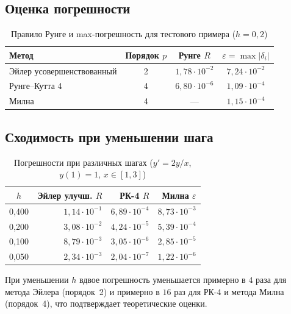 \documentclass[a4paper,12pt]{article}
\begin{document}
\subsection{Оценка погрешности}

\begin{table}[H]
\centering
\caption{Правило Рунге и max-погрешность для тестового примера ($h=0{,}2$)}
\begin{tabular}{lccc}
\toprule
Метод & Порядок $p$ & Рунге $R$ & $\varepsilon = \max|\delta_i|$ \\
\midrule
Эйлер усовершенствованный & 2 & $1{,}78 \cdot 10^{-2}$ & $7{,}24 \cdot 10^{-2}$ \\
Рунге--Кутта 4              & 4 & $6{,}80 \cdot 10^{-6}$ & $1{,}09 \cdot 10^{-4}$ \\
Милна                         & 4 & ---                    & $1{,}15 \cdot 10^{-4}$ \\
\bottomrule
\end{tabular}
\end{table}

\subsection{Сходимость при уменьшении шага}

\begin{table}[H]
\centering
\caption{Погрешности при различных шагах ($y' = 2y/x$, $y(1)=1$, $x \in [1,3]$)}
\begin{tabular}{crrr}
\toprule
$h$ & Эйлер улучш. $R$ & РК-4 $R$ & Милна $\varepsilon$ \\
\midrule
0,400 & $1,14 \cdot 10^{-1}$ & $6,89 \cdot 10^{-4}$ & $8,73 \cdot 10^{-3}$ \\
0,200 & $3,08 \cdot 10^{-2}$ & $4,24 \cdot 10^{-5}$ & $5,39 \cdot 10^{-4}$ \\
0,100 & $8,79 \cdot 10^{-3}$ & $3,05 \cdot 10^{-6}$ & $2,85 \cdot 10^{-5}$ \\
0,050 & $2,34 \cdot 10^{-3}$ & $2,04 \cdot 10^{-7}$ & $1,22 \cdot 10^{-6}$ \\
\bottomrule
\end{tabular}
\end{table}

При уменьшении $h$ вдвое погрешность уменьшается примерно в $4$ раза для метода
Эйлера (порядок~2) и примерно в $16$ раз для РК-4 и метода Милна (порядок~4),
что подтверждает теоретические оценки.

\end{document}
